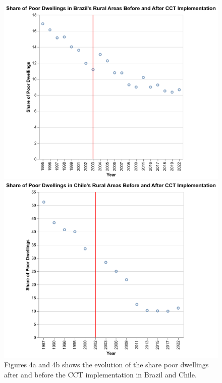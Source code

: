 \documentclass[
  10pt,
]{article}
\begin{document}
\begin{figure}

\begin{minipage}{0.50\linewidth}
\includegraphics{pictures/dwelling_Brazil.png}\end{minipage}%
%
\begin{minipage}{0.50\linewidth}
\includegraphics{pictures/dwelling_Chile.png}\end{minipage}%

\caption{\label{fig-combined}Figures 4a and 4b shows the evolution of
the share poor dwellings after and before the CCT implementation in
Brazil and Chile.}

\end{figure}%
\end{document}
